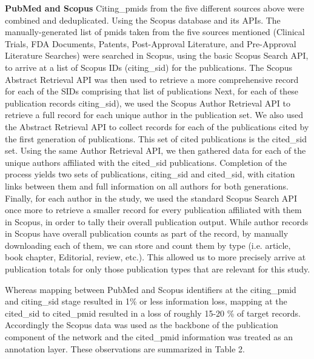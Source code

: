 \documentclass[10pt,letterpaper]{article}
\begin{document}
\textbf{PubMed and Scopus} Citing\_pmids from the five different sources above  were combined and deduplicated. Using the Scopus database and its APIs. The manually-generated list of pmids taken from the five sources mentioned (Clinical Trials, FDA Documents, Patents, Post-Approval Literature, and Pre-Approval Literature Searches) were searched in Scopus, using the basic Scopus Search API, to arrive at a list of Scopus IDs (citing\_sid) for the publications. The Scopus Abstract Retrieval API was then used to retrieve a more comprehensive record for each of the SIDs comprising that list of publications Next, for each of these publication records citing\_sid), we used the Scopus Author Retrieval API to retrieve a full record for each unique author in the  publication set. We also used the Abstract Retrieval API to collect records for each of the publications cited by the first generation of publications. This set of cited publications is the cited\_sid set.  Using the same Author Retrieval API, we then gathered data for each of the unique authors affiliated with the cited\_sid publications. Completion of the process yields two sets of publications, citing\_sid and cited\_sid, with citation links between them and full information on all authors for both generations. Finally, for each author in the study, we used the standard Scopus Search API once more to retrieve a smaller record for every publication affiliated with them in Scopus, in order to tally their overall publication output. While author records in Scopus have overall publication counts as part of the record, by manually downloading each of them, we can store and count them by type (i.e. article, book chapter, Editorial, review, etc.). This allowed us to more precisely arrive at publication totals for only those publication types that are relevant for this study.

Whereas mapping between PubMed and Scopus identifiers at the citing\_pmid and citing\_sid stage resulted in 1\% or less information loss, mapping at the cited\_sid to cited\_pmid resulted in a loss of roughly 15-20 \% of target records. Accordingly the Scopus data  was used as the backbone of the publication component of the network and the cited\_pmid information was treated as an annotation layer.  These observations are summarized in Table 2. 
\end{document}
